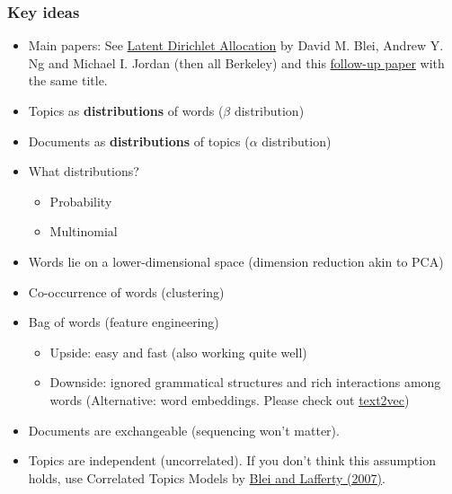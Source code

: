 \documentclass[
]{book}
\providecommand{\tightlist}{%
  \setlength{\itemsep}{0pt}\setlength{\parskip}{0pt}}
\begin{document}
\subsubsection{Key ideas}\label{key-ideas}

\begin{itemize}
\item
  Main papers: See \href{https://proceedings.neurips.cc/paper/2001/file/296472c9542ad4d4788d543508116cbc-Paper.pdf}{Latent Dirichlet Allocation} by David M. Blei, Andrew Y. Ng and Michael I. Jordan (then all Berkeley) and this \href{http://www.cse.cuhk.edu.hk/irwin.king/_media/presentations/latent_dirichlet_allocation.pdf}{follow-up paper} with the same title.
\item
  Topics as \textbf{distributions} of words (\(\beta\) distribution)
\item
  Documents as \textbf{distributions} of topics (\(\alpha\) distribution)
\item
  What distributions?

  \begin{itemize}
  \item
    Probability
  \item
    Multinomial
  \end{itemize}
\item
  Words lie on a lower-dimensional space (dimension reduction akin to PCA)
\item
  Co-occurrence of words (clustering)
\item
  Bag of words (feature engineering)

  \begin{itemize}
  \tightlist
  \item
    Upside: easy and fast (also working quite well)
  \item
    Downside: ignored grammatical structures and rich interactions among words (Alternative: word embeddings. Please check out \href{http://text2vec.org/}{text2vec})
  \end{itemize}
\item
  Documents are exchangeable (sequencing won't matter).
\item
  Topics are independent (uncorrelated). If you don't think this assumption holds, use Correlated Topics Models by \href{https://arxiv.org/pdf/0708.3601.pdf\#:~:text=The\%20correlated\%20topic\%20model\%20(CTM)\%20is\%20a\%20hierarchical\%20model\%20of,are\%20document\%2D\%20specific\%20random\%20variables.}{Blei and Lafferty (2007)}.
\end{itemize}
\end{document}

